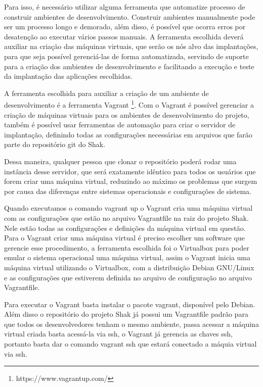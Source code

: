 Para isso, é necessário utilizar alguma ferramenta que automatize processo de 
construir ambientes de desenvolvimento. Construir ambientes manualmente pode
ser um processo longo e demorado, além disso, é possível que ocorra erros por
desatenção ao executar vários passos manuais. A ferramenta escolhida deverá auxiliar
 na criação das máquinas virtuais, que serão os nós alvo 
das implantações, para que seja possível gerenciá-las de forma automatizada, 
servindo de suporte para a criação dos ambientes de desenvolvimento e 
facilitando a execução e teste da implantação das aplicações escolhidas.

A ferramenta escolhida para auxiliar a criação de um ambiente de desenvolvimento é
a ferramenta Vagrant \footnote{https://www.vagrantup.com/}. Com o Vagrant é 
possível gerenciar a criação de máquinas
virtuais para os ambientes de desenvolvimento do projeto, também é possível usar
ferramentas de automação para criar o servidor de implantação, definindo todas
as configurações necessárias em arquivos que farão parte do repositório git do 
Shak. 

Dessa maneira, qualquer pessoa que clonar o repositório poderá rodar uma 
instância desse servidor, que será exatamente idêntico para todos os usuários 
que forem criar uma máquina virtual, reduzindo ao máximo os problemas que surgem 
por causa das diferenças entre sistemas operacionais e configurações de sistema.

Quando executamos o comando vagrant up o Vagrant cria uma máquina virtual com as
configurações que estão no arquivo Vagrantfile na raiz do projeto Shak. Nele
estão todas as configurações e definições da máquina virtual em questão. Para o
Vagrant criar uma máquina virtual é preciso escolher um software que gerencie
esse procedimento, a ferramenta escolhida foi o Virtualbox para poder emular o sistema
operacional uma máquina virtual, assim o Vagrant inicia uma máquina virtual
utilizando o Virtualbox, com a distribuição Debian GNU/Linux e as configurações que estiverem
definida no arquivo de configuração no arquivo Vagrantfile.

Para executar o Vagrant basta instalar o pacote vagrant, disponível pelo Debian. Além disso
o repositório do projeto Shak já possui um Vagrantfile padrão para que todos os
desenvolvedores tenham o mesmo ambiente, passa acessar a máquina virtual criada
basta acessá-la via ssh, o Vagrant já gerencia as chaves ssh, portanto basta
dar o comando vagrant ssh que estará conectado a máquia virtual via ssh.

